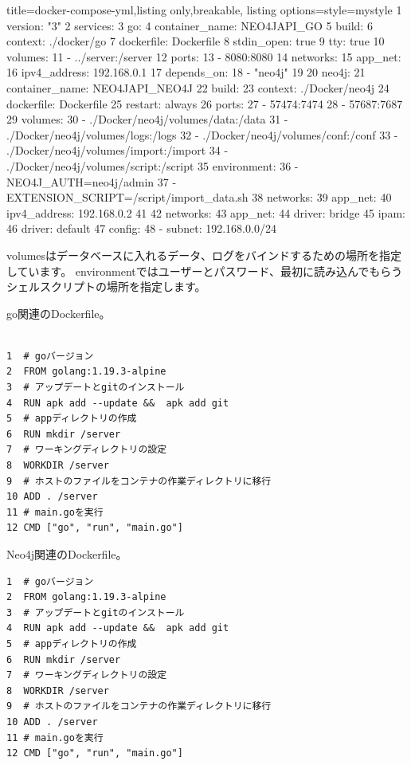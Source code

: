 \begin{tcblisting}{title={docker-compose-yml},listing only,breakable, listing options={style=mystyle}}
  1 version: "3"
  2 services:
  3   go:
  4     container_name: NEO4JAPI_GO
  5     build:
  6       context: ./docker/go
  7       dockerfile: Dockerfile
  8     stdin_open: true
  9     tty: true
  10    volumes:
  11      - ../server:/server
  12    ports:
  13      - 8080:8080
  14    networks:
  15      app_net:
  16        ipv4_address: 192.168.0.1
  17    depends_on:
  18      - "neo4j"
  19
  20  neo4j:
  21    container_name: NEO4JAPI_NEO4J
  22    build:
  23      context: ./Docker/neo4j
  24      dockerfile: Dockerfile
  25    restart: always
  26    ports:
  27      - 57474:7474
  28      - 57687:7687
  29    volumes:
  30      - ./Docker/neo4j/volumes/data:/data
  31      - ./Docker/neo4j/volumes/logs:/logs
  32      - ./Docker/neo4j/volumes/conf:/conf
  33      - ./Docker/neo4j/volumes/import:/import
  34      - ./Docker/neo4j/volumes/script:/script
  35    environment:
  36      - NEO4J_AUTH=neo4j/admin
  37      - EXTENSION_SCRIPT=/script/import_data.sh
  38    networks:
  39      app_net:
  40        ipv4_address: 192.168.0.2
  41
  42 networks:
  43  app_net:
  44    driver: bridge
  45    ipam:
  46      driver: default
  47      config:
  48        - subnet: 192.168.0.0/24
\end{tcblisting}


volumesはデータベースに入れるデータ、ログをバインドするための場所を指定しています。
environmentではユーザーとパスワード、最初に読み込んでもらうシェルスクリプトの場所を指定します。

go関連のDockerfile。
\begin{tcolorbox}[title=Dockerfile]
\begin{verbatim}

1  # goバージョン
2  FROM golang:1.19.3-alpine
3  # アップデートとgitのインストール
4  RUN apk add --update &&  apk add git
5  # appディレクトリの作成
6  RUN mkdir /server
7  # ワーキングディレクトリの設定
8  WORKDIR /server
9  # ホストのファイルをコンテナの作業ディレクトリに移行
10 ADD . /server
11 # main.goを実行
12 CMD ["go", "run", "main.go"]
\end{verbatim}
\end{tcolorbox}

Neo4j関連のDockerfile。
\begin{tcolorbox}[title=Dockerfile]
\begin{verbatim}
1  # goバージョン
2  FROM golang:1.19.3-alpine
3  # アップデートとgitのインストール
4  RUN apk add --update &&  apk add git
5  # appディレクトリの作成
6  RUN mkdir /server
7  # ワーキングディレクトリの設定
8  WORKDIR /server
9  # ホストのファイルをコンテナの作業ディレクトリに移行
10 ADD . /server
11 # main.goを実行
12 CMD ["go", "run", "main.go"]
\end{verbatim}
\end{tcolorbox}

